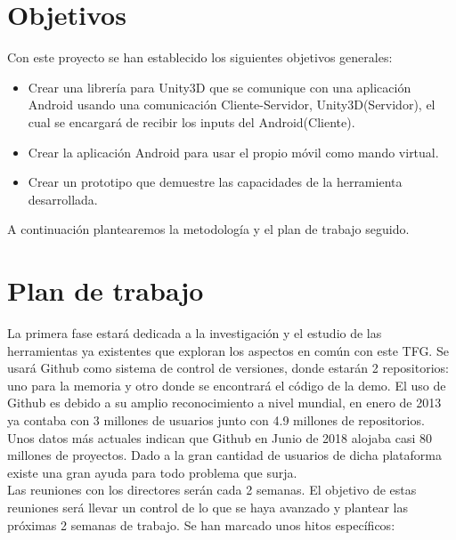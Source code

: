 \section{Objetivos}
\label{cap3:sec:obejtivos}

Con este proyecto se han establecido los siguientes objetivos generales:

\begin{itemize}
\item Crear una librer\'ia para Unity3D que se comunique con una aplicaci\'on Android usando una comunicaci\'on Cliente-Servidor, Unity3D(Servidor), el cual se encargar\'a de recibir los inputs del Android(Cliente).
\item Crear la aplicaci\'on Android para usar el propio m\'ovil como mando virtual.
\item Crear un prototipo que demuestre las capacidades de la herramienta desarrollada.
\end{itemize}

A continuaci\'on plantearemos la metodolog\'ia y el plan de trabajo seguido.


\section{Plan de trabajo}
\label{cap3:sec:plandetrabajo}

La primera fase estar\'a dedicada a la investigaci\'on y el estudio de las herramientas ya existentes que exploran los aspectos en com\'un con este TFG. Se usar\'a Github como sistema de control de versiones, donde estar\'an 2 repositorios: uno para la memoria y otro donde se encontrar\'a el c\'odigo de la demo. El uso de Github es debido a su amplio reconocimiento a nivel mundial, en enero de 2013 ya contaba con 3 millones de usuarios junto con 4.9 millones de repositorios. Unos datos m\'as actuales indican que Github en Junio de 2018 alojaba casi 80 millones de proyectos. Dado a la gran cantidad de usuarios de dicha plataforma existe una gran ayuda para todo problema que surja.
\\
Las reuniones con los directores ser\'an cada 2 semanas. El objetivo de estas reuniones ser\'a llevar un control de lo que se haya avanzado y plantear las pr\'oximas 2 semanas de trabajo.
Se han marcado unos hitos espec\'ificos:

